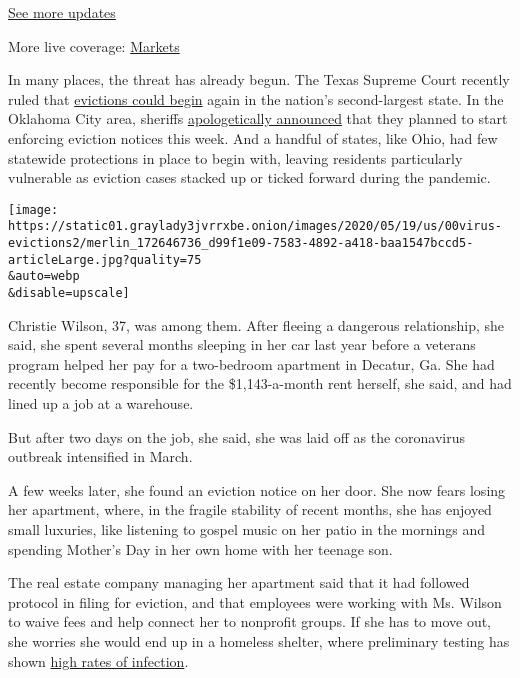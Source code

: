\href{https://www.nytimes3xbfgragh.onion/2020/08/21/world/covid-19-coronavirus.html?action=click\&pgtype=Article\&state=default\&region=MAIN_CONTENT_1\&context=storylines_live_updates}{See
more updates}

More live coverage:
\href{https://www.nytimes3xbfgragh.onion/live/2020/08/20/business/stock-market-today-coronavirus?action=click\&pgtype=Article\&state=default\&region=MAIN_CONTENT_1\&context=storylines_live_updates}{Markets}

In many places, the threat has already begun. The Texas Supreme Court
recently ruled that
\href{https://www.texastribune.org/2020/05/14/texas-evictions-debt-collections-resume-may-moratoriums-lifted/}{evictions
could begin} again in the nation's second-largest state. In the Oklahoma
City area, sheriffs
\href{https://twitter.com/OkCountySheriff/status/1262825685036535809?s=20}{apologetically
announced} that they planned to start enforcing eviction notices this
week. And a handful of states, like Ohio, had few statewide protections
in place to begin with, leaving residents particularly vulnerable as
eviction cases stacked up or ticked forward during the pandemic.

\texttt{[image: https://static01.graylady3jvrrxbe.onion/images/2020/05/19/us/00virus-evictions2/merlin\_172646736\_d99f1e09-7583-4892-a418-baa1547bccd5-articleLarge.jpg?quality=75\\\&auto=webp\\\&disable=upscale]}

Christie Wilson, 37, was among them. After fleeing a dangerous
relationship, she said, she spent several months sleeping in her car
last year before a veterans program helped her pay for a two-bedroom
apartment in Decatur, Ga. She had recently become responsible for the
\$1,143-a-month rent herself, she said, and had lined up a job at a
warehouse.

But after two days on the job, she said, she was laid off as the
coronavirus outbreak intensified in March.

A few weeks later, she found an eviction notice on her door. She now
fears losing her apartment, where, in the fragile stability of recent
months, she has enjoyed small luxuries, like listening to gospel music
on her patio in the mornings and spending Mother's Day in her own home
with her teenage son.

The real estate company managing her apartment said that it had followed
protocol in filing for eviction, and that employees were working with
Ms. Wilson to waive fees and help connect her to nonprofit groups. If
she has to move out, she worries she would end up in a homeless shelter,
where preliminary testing has shown
\href{https://www.wbur.org/commonhealth/2020/05/15/boston-homeless-coronavirus-testing}{high
rates of infection}.

